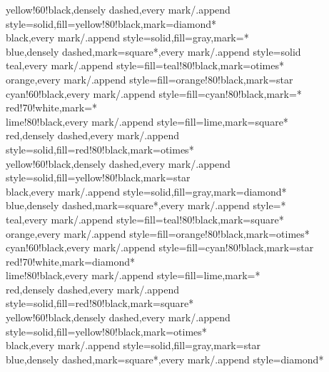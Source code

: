 {    yellow!60!black,densely dashed,every mark/.append style={solid,fill=yellow!80!black},mark=diamond*\\%
    black,every mark/.append style={solid,fill=gray},mark=*\\%
    blue,densely dashed,mark=square*,every mark/.append style=solid\\%
    teal,every mark/.append style={fill=teal!80!black},mark=otimes*\\%
    orange,every mark/.append style={fill=orange!80!black},mark=star\\%
    cyan!60!black,every mark/.append style={fill=cyan!80!black},mark=*\\%
    red!70!white,mark=*\\%
    lime!80!black,every mark/.append style={fill=lime},mark=square*\\%
    red,densely dashed,every mark/.append style={solid,fill=red!80!black},mark=otimes*\\%
    yellow!60!black,densely dashed,every mark/.append style={solid,fill=yellow!80!black},mark=star\\%
    black,every mark/.append style={solid,fill=gray},mark=diamond*\\%
    blue,densely dashed,mark=square*,every mark/.append style=*\\%
    teal,every mark/.append style={fill=teal!80!black},mark=square*\\%
    orange,every mark/.append style={fill=orange!80!black},mark=otimes*\\%
    cyan!60!black,every mark/.append style={fill=cyan!80!black},mark=star\\%
    red!70!white,mark=diamond*\\%
    lime!80!black,every mark/.append style={fill=lime},mark=*\\%
    red,densely dashed,every mark/.append style={solid,fill=red!80!black},mark=square*\\%
    yellow!60!black,densely dashed,every mark/.append style={solid,fill=yellow!80!black},mark=otimes*\\%
    black,every mark/.append style={solid,fill=gray},mark=star\\%
    blue,densely dashed,mark=square*,every mark/.append style=diamond*\\%
}
